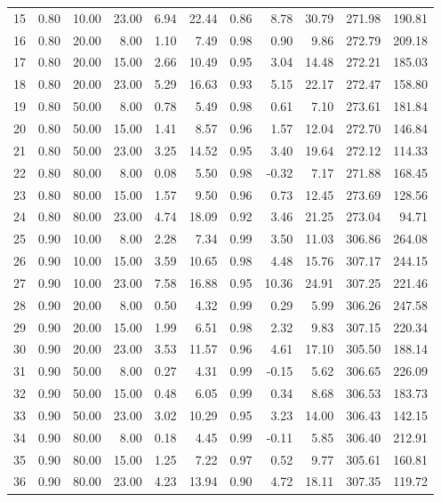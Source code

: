 \documentclass[useAMS, usenatbib, referee]{biom}\usepackage[]{graphicx}\usepackage[]{color}
\begin{document}
\begin{table}[ht]
{\begin{tabular}{rrrrrrrrrrr}
  15 & 0.80 & 10.00 & 23.00 & 6.94 & 22.44 & 0.86 & 8.78 & 30.79 & 271.98 & 190.81 \\ 
  16 & 0.80 & 20.00 & 8.00 & 1.10 & 7.49 & 0.98 & 0.90 & 9.86 & 272.79 & 209.18 \\ 
  17 & 0.80 & 20.00 & 15.00 & 2.66 & 10.49 & 0.95 & 3.04 & 14.48 & 272.21 & 185.03 \\ 
  18 & 0.80 & 20.00 & 23.00 & 5.29 & 16.63 & 0.93 & 5.15 & 22.17 & 272.47 & 158.80 \\ 
  19 & 0.80 & 50.00 & 8.00 & 0.78 & 5.49 & 0.98 & 0.61 & 7.10 & 273.61 & 181.84 \\ 
  20 & 0.80 & 50.00 & 15.00 & 1.41 & 8.57 & 0.96 & 1.57 & 12.04 & 272.70 & 146.84 \\ 
  21 & 0.80 & 50.00 & 23.00 & 3.25 & 14.52 & 0.95 & 3.40 & 19.64 & 272.12 & 114.33 \\ 
  22 & 0.80 & 80.00 & 8.00 & 0.08 & 5.50 & 0.98 & -0.32 & 7.17 & 271.88 & 168.45 \\ 
  23 & 0.80 & 80.00 & 15.00 & 1.57 & 9.50 & 0.96 & 0.73 & 12.45 & 273.69 & 128.56 \\ 
  24 & 0.80 & 80.00 & 23.00 & 4.74 & 18.09 & 0.92 & 3.46 & 21.25 & 273.04 & 94.71 \\ 
  25 & 0.90 & 10.00 & 8.00 & 2.28 & 7.34 & 0.99 & 3.50 & 11.03 & 306.86 & 264.08 \\ 
  26 & 0.90 & 10.00 & 15.00 & 3.59 & 10.65 & 0.98 & 4.48 & 15.76 & 307.17 & 244.15 \\ 
  27 & 0.90 & 10.00 & 23.00 & 7.58 & 16.88 & 0.95 & 10.36 & 24.91 & 307.25 & 221.46 \\ 
  28 & 0.90 & 20.00 & 8.00 & 0.50 & 4.32 & 0.99 & 0.29 & 5.99 & 306.26 & 247.58 \\ 
  29 & 0.90 & 20.00 & 15.00 & 1.99 & 6.51 & 0.98 & 2.32 & 9.83 & 307.15 & 220.34 \\ 
  30 & 0.90 & 20.00 & 23.00 & 3.53 & 11.57 & 0.96 & 4.61 & 17.10 & 305.50 & 188.14 \\ 
  31 & 0.90 & 50.00 & 8.00 & 0.27 & 4.31 & 0.99 & -0.15 & 5.62 & 306.65 & 226.09 \\ 
  32 & 0.90 & 50.00 & 15.00 & 0.48 & 6.05 & 0.99 & 0.34 & 8.68 & 306.53 & 183.73 \\ 
  33 & 0.90 & 50.00 & 23.00 & 3.02 & 10.29 & 0.95 & 3.23 & 14.00 & 306.43 & 142.15 \\ 
  34 & 0.90 & 80.00 & 8.00 & 0.18 & 4.45 & 0.99 & -0.11 & 5.85 & 306.40 & 212.91 \\ 
  35 & 0.90 & 80.00 & 15.00 & 1.25 & 7.22 & 0.97 & 0.52 & 9.77 & 305.61 & 160.81 \\ 
  36 & 0.90 & 80.00 & 23.00 & 4.23 & 13.94 & 0.90 & 4.72 & 18.11 & 307.35 & 119.72 \\ 
   \hline
\end{tabular}
}
\endgroup
\end{table}
\end{document}
